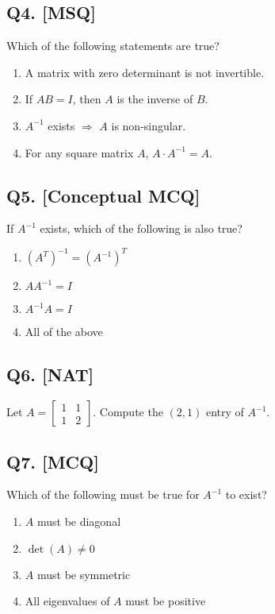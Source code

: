 \subsection*{Q4. [MSQ]}
Which of the following statements are true?

\begin{enumerate}[label=(\alph*)]
    \item A matrix with zero determinant is not invertible.
    \item If $AB = I$, then $A$ is the inverse of $B$.
    \item $A^{-1}$ exists $\Rightarrow$ $A$ is non-singular.
    \item For any square matrix $A$, $A \cdot A^{-1} = A$.
\end{enumerate}

\subsection*{Q5. [Conceptual MCQ]}
If $A^{-1}$ exists, which of the following is also true?

\begin{enumerate}[label=(\alph*)]
    \item $(A^T)^{-1} = (A^{-1})^T$ 
    \item $AA^{-1} = I$ 
    \item $A^{-1}A = I$ 
    \item All of the above
\end{enumerate}

\subsection*{Q6. [NAT]}
Let $A = \begin{bmatrix} 1 & 1 \\ 1 & 2 \end{bmatrix}$. Compute the $(2,1)$ entry of $A^{-1}$.

\subsection*{Q7. [MCQ]}
Which of the following must be true for $A^{-1}$ to exist?

\begin{enumerate}[label=(\alph*)]
    \item $A$ must be diagonal
    \item $\det(A) \neq 0$
    \item $A$ must be symmetric
    \item All eigenvalues of $A$ must be positive
\end{enumerate}

